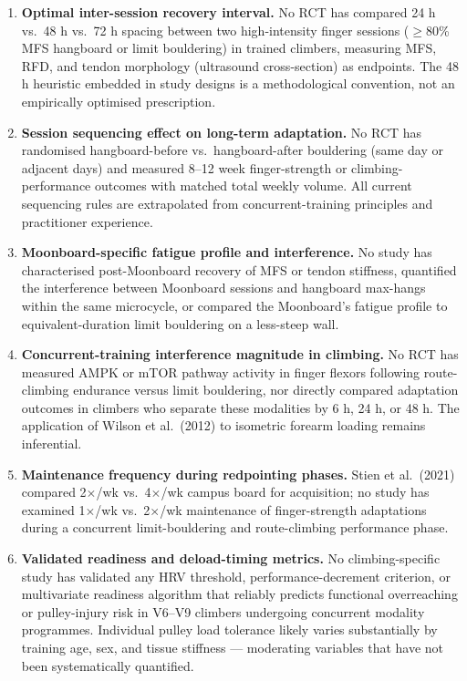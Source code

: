 \begin{enumerate}

  \item \textbf{Optimal inter-session recovery interval.} No RCT has compared 24 h vs.\ 48 h vs.\ 72 h spacing between two high-intensity finger sessions ($\geq$80\% MFS hangboard or limit bouldering) in trained climbers, measuring MFS, RFD, and tendon morphology (ultrasound cross-section) as endpoints. The 48 h heuristic embedded in study designs is a methodological convention, not an empirically optimised prescription.

  \item \textbf{Session sequencing effect on long-term adaptation.} No RCT has randomised hangboard-before vs.\ hangboard-after bouldering (same day or adjacent days) and measured 8–12 week finger-strength or climbing-performance outcomes with matched total weekly volume. All current sequencing rules are extrapolated from concurrent-training principles and practitioner experience.

  \item \textbf{Moonboard-specific fatigue profile and interference.} No study has characterised post-Moonboard recovery of MFS or tendon stiffness, quantified the interference between Moonboard sessions and hangboard max-hangs within the same microcycle, or compared the Moonboard's fatigue profile to equivalent-duration limit bouldering on a less-steep wall.

  \item \textbf{Concurrent-training interference magnitude in climbing.} No RCT has measured AMPK or mTOR pathway activity in finger flexors following route-climbing endurance versus limit bouldering, nor directly compared adaptation outcomes in climbers who separate these modalities by 6 h, 24 h, or 48 h. The application of Wilson et al.\ (2012) to isometric forearm loading remains inferential.

  \item \textbf{Maintenance frequency during redpointing phases.} Stien et al.\ (2021) compared 2$\times$/wk vs.\ 4$\times$/wk campus board for acquisition; no study has examined 1$\times$/wk vs.\ 2$\times$/wk maintenance of finger-strength adaptations during a concurrent limit-bouldering and route-climbing performance phase.

  \item \textbf{Validated readiness and deload-timing metrics.} No climbing-specific study has validated any HRV threshold, performance-decrement criterion, or multivariate readiness algorithm that reliably predicts functional overreaching or pulley-injury risk in V6–V9 climbers undergoing concurrent modality programmes. Individual pulley load tolerance likely varies substantially by training age, sex, and tissue stiffness — moderating variables that have not been systematically quantified.

\end{enumerate}
